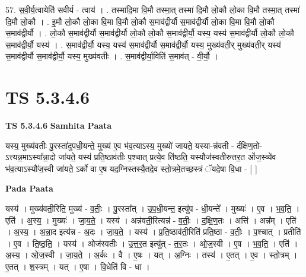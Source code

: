 \documentclass[17pt]{extarticle}
\begin{document}
57. स॒वी॒र्य॒त्वायेति॑ सवीर्य - त्वाय॑ । . तस्मा॑दि॒मा वि॒मौ तस्मा॒त् तस्मा॑ दि॒मौ लो॒कौ लो॒का वि॒मौ तस्मा॒त् तस्मा॑ दि॒मौ लो॒कौ । . इ॒मौ लो॒कौ लो॒का वि॒मा वि॒मौ लो॒कौ स॒माव॑द्वीर्यौ स॒माव॑द्वीर्यौ लो॒का वि॒मा वि॒मौ लो॒कौ स॒माव॑द्वीर्यौ । . लो॒कौ स॒माव॑द्वीर्यौ स॒माव॑द्वीर्यौ लो॒कौ लो॒कौ स॒माव॑द्वीर्यौ॒ यस्य॒ यस्य॑ स॒माव॑द्वीर्यौ लो॒कौ लो॒कौ स॒माव॑द्वीर्यौ॒ यस्य॑ । . स॒माव॑द्वीर्यौ॒ यस्य॒ यस्य॑ स॒माव॑द्वीर्यौ स॒माव॑द्वीर्यौ॒ यस्य॒ मुख्य॑वती॒र् मुख्य॑वती॒र् यस्य॑ स॒माव॑द्वीर्यौ स॒माव॑द्वीर्यौ॒ यस्य॒ मुख्य॑वतीः । . स॒माव॑द्वीर्या॒विति॑ स॒माव॑त् - वी॒र्यौ॒ । \newline
\pagebreak
{}

\section{ TS 5.3.4.6 }

\textbf{TS 5.3.4.6 } \newline
\textbf{Samhita Paata} \newline

यस्य॒ मुख्य॑वतीः पु॒रस्ता॑दुपधी॒यन्ते॒ मुख्य॑ ए॒व भ॑व॒त्याऽस्य॒ मुख्यो॑ जायते॒ यस्या-न्न॑वती - र्दक्षिण॒तो-ऽत्त्यन्न॒माऽस्या᳚न्ना॒दो जा॑यते॒ यस्य॑ प्रति॒ष्ठाव॑तीः प॒श्चात् प्रत्ये॒व ति॑ष्ठति॒ यस्यौज॑स्वतीरुत्तर॒त ओ॑ज॒स्व्ये॑व भ॑व॒त्याऽस्यौ॑ज॒स्वी जा॑यते॒ ऽर्को वा ए॒ष यद॒ग्निस्तस्यै॒तदे॒व स्तो॒त्रमे॒तच्छ॒स्त्रं ॅयदे॒षा वि॒धा - [  ] \newline

\textbf{Pada Paata} \newline

यस्य॑ । मुख्य॑वती॒रिति॒ मुख्य॑ - व॒तीः॒ । पु॒रस्ता᳚त् । उ॒प॒धी॒यन्त॒ इत्यु॑प - धी॒यन्ते᳚ । मुख्यः॑ । ए॒व । भ॒व॒ति॒ । एति॑ । अ॒स्य॒ । मुख्यः॑ । जा॒य॒ते॒ । यस्य॑ । अन्न॑वती॒रित्यन्न॑ - व॒तीः॒ । द॒क्षि॒ण॒तः । अत्ति॑ । अन्न᳚म् । एति॑ । अ॒स्य॒ । अ॒न्ना॒द इत्य॑न्न - अ॒दः । जा॒य॒ते॒ । यस्य॑ । प्र॒ति॒ष्ठाव॑ती॒रिति॑ प्रति॒ष्ठा - व॒तीः॒ । प॒श्चात् । प्रतीति॑ । ए॒व । ति॒ष्ठ॒ति॒ । यस्य॑ । ओज॑स्वतीः । उ॒त्त॒र॒त इत्यु॑त् - त॒र॒तः । ओ॒ज॒स्वी । ए॒व । भ॒व॒ति॒ । एति॑ । अ॒स्य॒ । ओ॒ज॒स्वी । जा॒य॒ते॒ । अ॒र्कः । वै । ए॒षः । यत् । अ॒ग्निः । तस्य॑ । ए॒तत् । ए॒व । स्तो॒त्रम् । ए॒तत् । श॒स्त्रम् । यत् । ए॒षा । वि॒धेति॑ वि - धा ।  \newline
\end{document}
